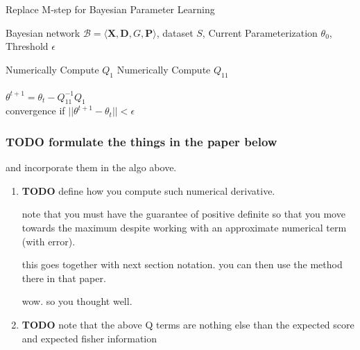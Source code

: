 \documentclass[11pt]{article}
\begin{document}
\begin{article}
\begin{algorithm*}[h!]
\caption{Replace M-step for Bayesian Parameter Learning}
\label{alg:Numerical-M-Step}
\vspace{-10pt}
\begin{multicols}{2}
\begin{algorithmic}[1] 
\Require Bayesian network $\mathcal{B}=\langle \mathbf{X},\mathbf{D}, G, \mathbf{P} \rangle$, dataset $S$, Current Parameterization $\theta_0$, Threshold $\epsilon$

   \State Numerically Compute $Q_1$
   \State Numerically Compute $Q_{11}$\\

   \\
      \State $\theta^{t+1}= \theta_{t} - Q_{11}^{-1} Q_1$\\
      \State convergence if $||\theta^{t+1} - \theta_{t}|| < \epsilon$
   \EndForAll
\end{algorithmic}
\end{multicols}
\end{algorithm*}


\subsubsection{{\bfseries\sffamily TODO} formulate the things in the paper below}
\label{sec:org26fe91a}

and incorporate them in the algo above.

\begin{enumerate}
\item {\bfseries\sffamily TODO} define how you compute such numerical derivative.
\label{sec:org0d6a9b2}

note that you must have the guarantee of positive definite so that
you move towards the maximum despite working with an approximate
numerical term (with error).

this goes together with next section notation. you can then use the
method there in that paper.

wow. so you thought well.


\item {\bfseries\sffamily TODO} note that the above Q terms are nothing else than the expected score and expected fisher information
\label{sec:org3535d9f}


\end{enumerate}
\end{article}
\end{document}
